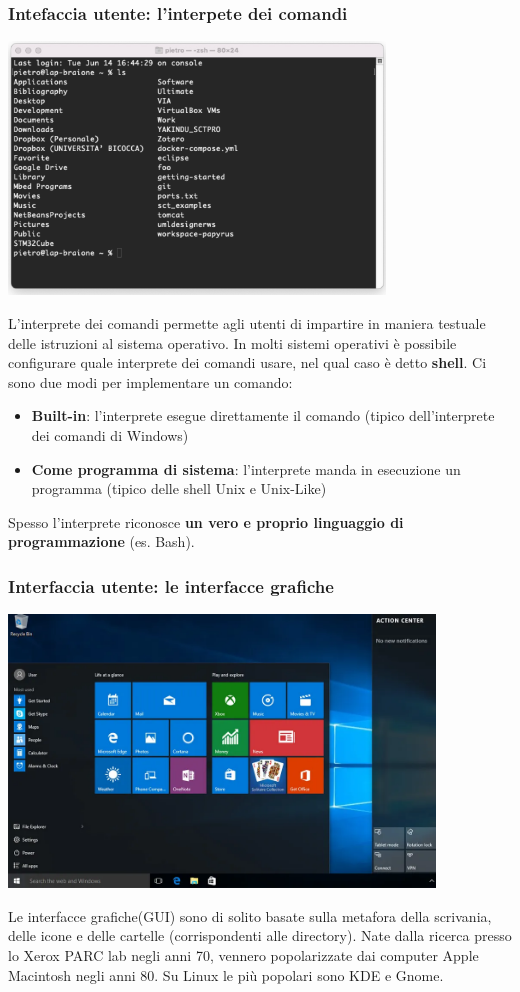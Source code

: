 \documentclass[12pt]{article}
\begin{document}
\subsubsection{Intefaccia utente: l'interpete dei comandi}
\begin{center}
    \includegraphics[width = 0.75\textwidth]{Images/6.PNG}
\end{center}
L'interprete dei comandi permette agli utenti di impartire in maniera testuale delle istruzioni al sistema operativo.
In molti sistemi operativi è possibile configurare quale interprete dei comandi usare, nel qual caso è detto \textbf{shell}.
Ci sono due modi per implementare un comando:
\begin{itemize}
    \item \textbf{Built-in}: l'interprete esegue direttamente il comando (tipico dell'interprete dei comandi di Windows)
    \item \textbf{Come programma di sistema}: l'interprete manda in esecuzione un programma (tipico delle shell Unix e Unix-Like)
\end{itemize}
Spesso l'interprete riconosce \textbf{un vero e proprio linguaggio di programmazione} (es. Bash).
\subsubsection{Interfaccia utente: le interfacce grafiche}
\begin{center}
    \includegraphics[width = 0.85\textwidth]{Images/7.png}
\end{center}
Le interfacce grafiche(GUI) sono di solito basate sulla metafora della scrivania, delle icone e delle cartelle (corrispondenti alle directory).
Nate dalla ricerca presso lo Xerox PARC lab negli anni 70, vennero popolarizzate dai computer Apple Macintosh negli anni 80. Su Linux le più popolari sono KDE e Gnome.
\newpage
\end{document}
